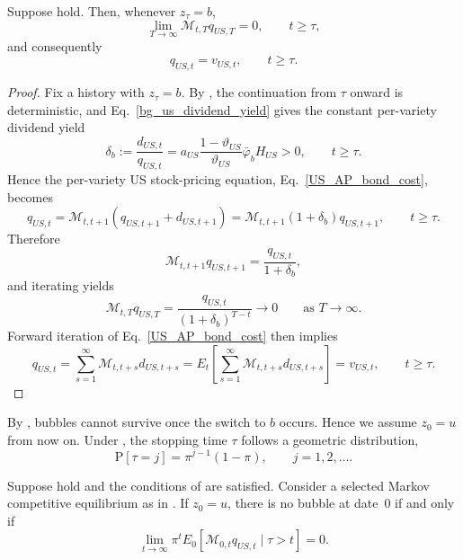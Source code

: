 \documentclass{article}
\begin{document}
\begin{prop}\label{prop_no_bubble_absorbing_branch}\label{prop1}
Suppose  hold. Then, whenever $z_\tau=b$,
\[
\lim_{T\to\infty}\mathcal M_{t,T}q_{US,T}=0,
\qquad
t\ge \tau,
\]
and consequently
\[
q_{US,t}=v_{US,t},
\qquad
t\ge \tau.
\]
\end{prop}

\begin{proof}
Fix a history with $z_\tau=b$. By , the continuation from $\tau$ onward is deterministic, and Eq.~\eqref{bg_us_dividend_yield} gives the constant per-variety dividend yield
\[
\delta_b
:=
\frac{d_{US,t}}{q_{US,t}}
=
a_{US}\frac{1-\vartheta_{US}}{\vartheta_{US}}\bar\varphi_b H_{US}
>0,
\qquad
t\ge \tau.
\]
Hence the per-variety US stock-pricing equation, Eq.~\eqref{US_AP_bond_cost}, becomes
\[
q_{US,t}
=
\mathcal M_{t,t+1}(q_{US,t+1}+d_{US,t+1})
=
\mathcal M_{t,t+1}(1+\delta_b)q_{US,t+1},
\qquad
t\ge \tau.
\]
Therefore
\[
\mathcal M_{t,t+1}q_{US,t+1}
=
\frac{q_{US,t}}{1+\delta_b},
\]
and iterating yields
\[
\mathcal M_{t,T}q_{US,T}
=
\frac{q_{US,t}}{(1+\delta_b)^{T-t}}
\to 0
\qquad\text{as }T\to\infty.
\]
Forward iteration of Eq.~\eqref{US_AP_bond_cost} then implies
\[
q_{US,t}
=
\sum_{s=1}^{\infty}\mathcal M_{t,t+s}d_{US,t+s}
=
E_t\!\left[\sum_{s=1}^{\infty}\mathcal M_{t,t+s}d_{US,t+s}\right]
=
v_{US,t},
\qquad
t\ge \tau.
\]
\end{proof}

By , bubbles cannot survive once the switch to $b$ occurs. Hence we assume $z_0=u$ from now on. Under , the stopping time $\tau$ follows a geometric distribution,
\[
\mathrm{P}[\tau=j]=\pi^{j-1}(1-\pi),
\qquad
j=1,2,\ldots.
\]

\begin{prop}\label{prop_no_bubble_criterion}\label{prop2}
Suppose  hold and the conditions of  are satisfied. Consider a selected Markov competitive equilibrium as in . If $z_0=u$, there is no bubble at date~0 if and only if
\[
\lim_{t\to\infty}\pi^t E_0\!\left[\mathcal M_{0,t}q_{US,t}\mid \tau>t\right]=0.
\]
\end{prop}
\end{document}
